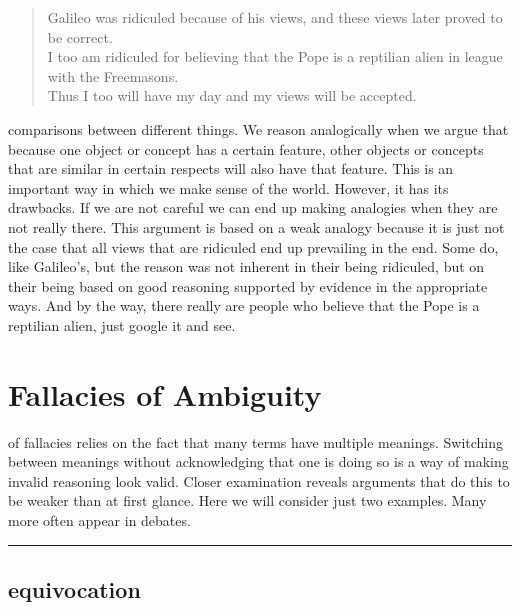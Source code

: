 \documentclass[justified]{tufte-book}
\newenvironment{argument}{\begin{quote}\normalsize}{\end{quote}}
\begin{document}
\begin{argument}
Galileo was ridiculed because of his views, and these views later proved
to be correct.\\
I too am ridiculed for believing that the Pope is a reptilian alien in
league with the Freemasons.\\
Thus I too will have my day and my views will be accepted.
\end{argument}

 comparisons between different things. We reason analogically when we argue that because one object or concept has a certain feature, other objects or concepts that are similar in certain respects will also have that feature. This is an important way in which we make sense of the world. However, it has its drawbacks. If we are not careful we can end up making analogies when they are not really there. This argument is based on a weak analogy because it is just not the case that all views that are ridiculed end up prevailing in the end. Some do, like Galileo's, but the reason was not inherent in their being ridiculed, but on their being based on good reasoning supported by evidence in the appropriate ways. And by the way, there really are people who believe that the Pope is a reptilian alien, just google it and see.

\hypertarget{fallacies-of-ambiguity}{%
\section{Fallacies of Ambiguity}\label{fallacies-of-ambiguity}}

 of fallacies relies on the fact that many terms have multiple meanings. Switching between meanings without acknowledging that one is doing so is a way of making invalid reasoning look valid. Closer examination reveals arguments that do this to be weaker than at first glance. Here we will consider just two examples. Many more often appear in debates.

\begin{center}\rule{0.5\linewidth}{\linethickness}\end{center}

\hypertarget{equivocation}{%
\subsection*{equivocation}\label{equivocation}}
\end{document}
